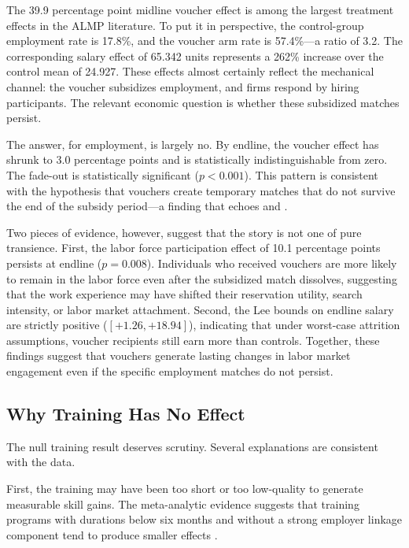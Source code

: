 \documentclass[12pt]{article}
\begin{document}
The 39.9 percentage point midline voucher effect is among the largest treatment effects in the ALMP literature. To put it in perspective, the control-group employment rate is 17.8\%, and the voucher arm rate is 57.4\%---a ratio of 3.2. The corresponding salary effect of 65.342 units represents a 262\% increase over the control mean of 24.927. These effects almost certainly reflect the mechanical channel: the voucher subsidizes employment, and firms respond by hiring participants. The relevant economic question is whether these subsidized matches persist.

The answer, for employment, is largely no. By endline, the voucher effect has shrunk to 3.0 percentage points and is statistically indistinguishable from zero. The fade-out is statistically significant ($p < 0.001$). This pattern is consistent with the hypothesis that vouchers create temporary matches that do not survive the end of the subsidy period---a finding that echoes \citet{galasso2004wage} and \citet{levinsohn2014subsidizing}.

Two pieces of evidence, however, suggest that the story is not one of pure transience. First, the labor force participation effect of 10.1 percentage points persists at endline ($p = 0.008$). Individuals who received vouchers are more likely to remain in the labor force even after the subsidized match dissolves, suggesting that the work experience may have shifted their reservation utility, search intensity, or labor market attachment. Second, the Lee bounds on endline salary are strictly positive ($[+1.26, +18.94]$), indicating that under worst-case attrition assumptions, voucher recipients still earn more than controls. Together, these findings suggest that vouchers generate lasting changes in labor market engagement even if the specific employment matches do not persist.

\subsection{Why Training Has No Effect}

The null training result deserves scrutiny. Several explanations are consistent with the data.

First, the training may have been too short or too low-quality to generate measurable skill gains. The meta-analytic evidence suggests that training programs with durations below six months and without a strong employer linkage component tend to produce smaller effects \citep{card2018what, kluve2019interventions}.
\end{document}
